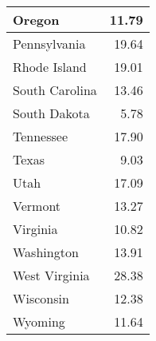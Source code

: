 \begin{table}
\begin{tabular}[t]{l|r}
\hline
Oregon & 11.79\\
\hline
Pennsylvania & 19.64\\
\hline
Rhode Island & 19.01\\
\hline
South Carolina & 13.46\\
\hline
South Dakota & 5.78\\
\hline
Tennessee & 17.90\\
\hline
Texas & 9.03\\
\hline
Utah & 17.09\\
\hline
Vermont & 13.27\\
\hline
Virginia & 10.82\\
\hline
Washington & 13.91\\
\hline
West Virginia & 28.38\\
\hline
Wisconsin & 12.38\\
\hline
Wyoming & 11.64\\
\hline
\end{tabular}
\end{table}